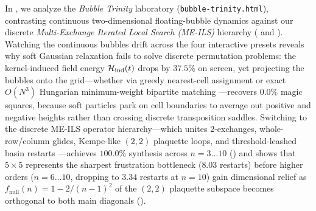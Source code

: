In , we analyze the \emph{Bubble Trinity} laboratory (\texttt{bubble-trinity.html}), contrasting continuous two-dimensional floating-bubble dynamics against our discrete \emph{Multi-Exchange Iterated Local Search (ME-ILS)} hierarchy ( and ). Watching the continuous bubbles drift across the four interactive presets reveals why soft Gaussian relaxation fails to solve discrete permutation problems: the kernel-induced field energy $\mathcal{H}_{\mathrm{ind}}(t)$ drops by $37.5\%$ on screen, yet projecting the bubbles onto the grid---whether via greedy nearest-cell assignment or exact $O(N^3)$ Hungarian minimum-weight bipartite matching \cite{kuhn1955hungarian,munkres1957algorithms}---recovers $0.0\%$ magic squares, because soft particles park on cell boundaries to average out positive and negative heights rather than crossing discrete transposition saddles. Switching to the discrete ME-ILS operator hierarchy---which unites $2$-exchanges, whole-row/column glides, Kempe-like $(2,2)$ plaquette loops, and threshold-leashed basin restarts \cite{wales1997global,mladenovic1997variable,lourenco2003iterated}---achieves $100.0\%$ synthesis across $n=3\dots 10$ () and shows that $5\times 5$ represents the sharpest frustration bottleneck ($8.03$ restarts) before higher orders ($n=6\dots 10$, dropping to $3.34$ restarts at $n=10$) gain dimensional relief as $f_{\mathrm{null}}(n) = 1 - 2/(n-1)^2$ of the $(2,2)$ plaquette subspace becomes orthogonal to both main diagonals ().

